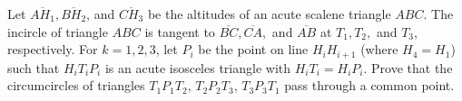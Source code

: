 Let $\overline{AH_1}, \overline{BH_2}$, and $\overline{CH_3}$ be the altitudes of an acute scalene triangle $ABC$. The incircle of triangle $ABC$ is tangent to $\overline{BC}, \overline{CA},$ and $\overline{AB}$ at $T_1, T_2,$ and $T_3$, respectively. For $k = 1, 2, 3$, let $P_i$ be the point on line $H_iH_{i+1}$ (where $H_4 = H_1$) such that $H_iT_iP_i$ is an acute isosceles triangle with $H_iT_i = H_iP_i$. Prove that the circumcircles of triangles $T_1P_1T_2$, $T_2P_2T_3$, $T_3P_3T_1$ pass through a common point.
